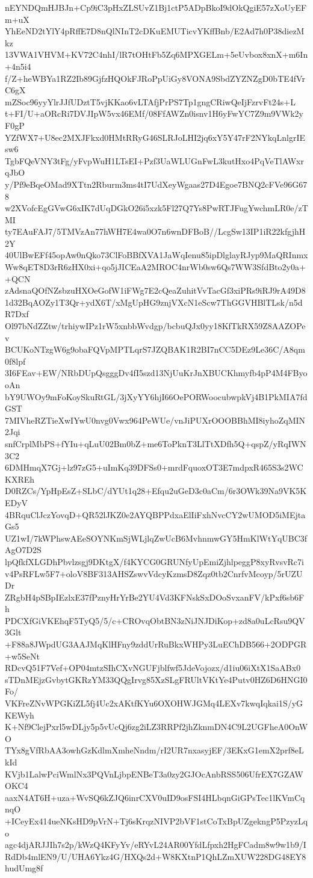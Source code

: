 nEYNDQmHJBJn+Cp9iC3pHxZLSUvZ1Bj1ctP5ADpBkoI9dOkQgiE57zXoUyEFm+uX
YhEeND2tYlY4pRffE7D8nQlNInT2cDKuEMUTicvYKffBnb/E2Ad7h0P38diezMkz
13VWA1VHVM+KV72C4nhI/lR7tOHtFb5Zq6MPXGELm+5eUvbox8xnX+m6In+4n5i4
f/Z+heWBYa1RZ2Ib89GjfzHQOkFJRoPpUiGy8VONA9SbdZYZNZgD0bTE4fVrC6gX
mZSoc96yyYlrJJfUDztT5vjKKao6vLTAfjPrPS7Tp1gngCRiwQeIjFzrvFt24s+L
t+FI/U+aORcRi7DVJIpW5vx46EMf/08FfAWZn0isnv1H6yFwYC7Z9m9VWk2yF0gP
YZfWX7+U8ec2MXJFkxd0HMtRRyG46SLRJoLHI2jq6xY5Y47rF2NYkqLnlgrIEsw6
TgbFQeVNY3tFg/yFvpWuH1LTsEI+Pzf3UaWLUGnFwL3kutHxo4PqVeTlAWxrqJbO
y/Pf9eBqeOMad9XTtn2Rburm3ms4tI7UdXeyWgaas27D4Egoe7BNQ2cFVe96G678
w2XVofcEgGVwG6xIK7dUqDGkO26i5xzk5Fl27Q7Ys8PwRTJFugYwchmLR0e/zTMI
ty7EAuFAJ7/5TMVzAn77hWH7E4wa0O7n6wnDFBoB//LcgSw13IP1iR22kfgjhH2Y
40UlBwEFf45opAw0nQko73ClFoBBfXVA1JaWqIenu85ipDlglayRJyp9MaQRInmx
Ww8qET8D3rR6zHX0xi+qo5jJICEaA2MROC4nrWb0sw6Qs7WW3SfdBto2y0a++QCN
zAdsnaQOfNZsbzuHXOeGofW1iFWg7E2cQeaZuhitVvTacGf3xiPRs9iRJ9rA49D8
1d32BqAOZy1T3Qr+ydX6T/xMgUpHG9znjVXcN1eScw7ThGGVHBlTLsk/n5dR7Dxf
Ol97bNdZZtw/trhiywIPz1rW5xnbbWvdgp/bcbuQJx0yy18KfTkRX59Z8AAZOPev
BCUKoNTzgW6g9obaFQVpMPTLqrS7JZQBAK1R2BI7nCC5DEz9Le36C/A8qm0f8lpf
3I6FEav+EW/NRbDUpQsgggDv4fI5szd13NjUuKrJnXBUCKhmyfb4pP4M4FByooAn
bY9UWOy9mFoKoySkuRtGL/3jXyYY6hjI66OePORWoocubwpkVj4B1PkMIA7fdGST
7MIVheRZTieXwIYwU0nvg0Vwx964PeWUe/vnJiPUXrOOOBBhMI8iyhoZqMIN2Jqi
snfCrplMbPS+fYIu+qLuU02Bm0bZ+me6ToPknT3LlTtXDfh5Q+qspZ/yRqIWN3C2
6DMHmqX7Gj+lz97zG5+uImKq39DFSs0+mrdFquoxOT3E7mdpxR465S3s2WCKXREh
D0RZCs/YpHpEsZ+SLbC/dYUt1q28+Efqu2uGeD3c0aCm/6r3OWk39Na9VK5KEDyV
4BRquClJczYovqD+QR52lJKZ0e2AYQBPPdxaElIiFxhNvcCY2wUMOD5iMEjtaGs5
UZ1wI/7kWPhswAEeSOYNKmSjWLjlqZwUcB6MvhnmwGY5HmKlWtYqUBC3fAgO7D2S
lpQfkfXLGDhPbvlzsgj9DKtgX/f4KYCG0GRUNfyUpEmiZjhlpeggP8xyRvsvRc7i
v4PsRFLw5F7+oloV8BF313AHSZswvVdcyKzmsD8Zqz0tb2CnrfvMcoyp/5rUZUDr
ZRgbH4pSBpIEzlxE37fPznyHrYrBe2YU4Vd3KFNskSxDOoSvxanFV/kPxf6sb6Fh
PDCXfGiVKEhqF5TyQ5/5/c+CROvqObtBN3zNiJNJDiKop+zd8a0uLcRsu9QV3Glt
+F88a8JWpdUG3AAJMqKlHFny9zddUrRuBkxWHPy3LuEChDB566+2ODPGR+w5SeNt
RDcvQ51F7Vef+OP04mtzSIhCXvNGUFjblfwf5JdeVojozx/d1iu06iXtX1SaABx0
sTDnMEjzGvbytGKRzYM33QQgIrvg85XzSLgFRUltVKtYe4Putv0HZ6D6HNGI0Fo/
VKFreZNvWPGKiZL5fj4Uc2xAKtfKYu6OXOHWJGMq4LEXv7kwqIqkai1S/yGKEWyh
K+Nf9ClejPxrl5wDLjy5p5vUcQj6zg2iLZ3RRPf2jhZknmDN4C9L2UGFheA0OnWO
TYx8gVfRbAA3owhGzKdlmXmheNndm/rI2UR7nxasyjEF/3EKxG1emX2prf8eLkId
KVjb1LalwPciWmlNx3PQVnLjbpENBeT3a0zy2GJOcAnbRSS506UfrEX7GZAWOKC4
aaxN4AT6H+uza+WvSQ6kZJQ6inrCXV0uID9osFSI4HLbqnGiGPsTec1lKVmCqnqO
+ICeyEx414ueNKsHD9pVrN+Tj6sKrqzNIVP2bVF1stCoTxBpUZgekngP5PzyzLqo
agc4djARJJIh7s2p/kWzQ4KFyYv/eRYvL24AR00YfdLfpxh2HgFCadm8w9w1b9/I
RdDb4mlEN9/U/UHA6Ykz4G/HXQs2d+W8KXtnP1QhLZmXUW228DG48EY8hudUmg8f
